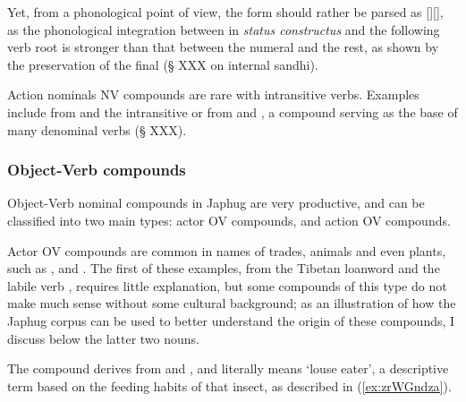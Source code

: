 Yet, from a phonological point of view, the form should rather be parsed as [][], as the phonological integration between  in \textit{status constructus} and the following verb root is stronger than that between the numeral  and the rest, as shown by the preservation of the final  (§ XXX on internal sandhi).

Action nominals NV compounds are rare with intransitive verbs. Examples include  from  and the intransitive  or  from   and , a compound serving as the base of many denominal verbs (§ XXX).

 
\subsubsection{Object-Verb compounds} \label{sec:object.verb.compounds}
Object-Verb nominal compounds in Japhug are very productive, and can be classified into two main types: actor OV compounds, and action OV compounds.

Actor OV compounds are common in names of trades, animals and even plants, such as ,  and . The first of these examples, from the Tibetan loanword  and the labile verb , requires little explanation, but some compounds of this type do not make much sense without some cultural background; as an illustration of how the Japhug corpus can be used to better understand the origin of these compounds, I discuss below the latter two nouns.

The compound  derives from  and , and literally means `louse eater', a descriptive term based on the feeding habits of that insect, as described in (\ref{ex:zrWGndza}).

